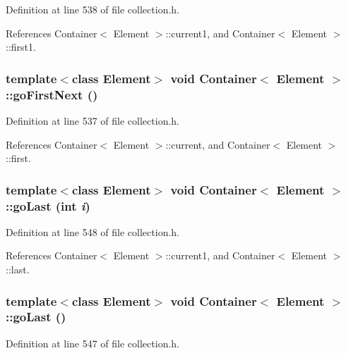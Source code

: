 Definition at line 538 of file collection.h.

References Container$<$ Element $>$::current1, and Container$<$ Element $>$::first1.\hypertarget{classContainer_63178fb6fc68357eceebbb98c6c3fd04}{
\subsubsection[{goFirstNext}]{\setlength{\rightskip}{0pt plus 5cm}template$<$class Element$>$ void {\bf Container}$<$ Element $>$::goFirstNext ()}}
\label{classContainer_63178fb6fc68357eceebbb98c6c3fd04}




Definition at line 537 of file collection.h.

References Container$<$ Element $>$::current, and Container$<$ Element $>$::first.\hypertarget{classContainer_21772656f0b4b9b273cc98bd9e59de9b}{
\subsubsection[{goLast}]{\setlength{\rightskip}{0pt plus 5cm}template$<$class Element$>$ void {\bf Container}$<$ Element $>$::goLast (int {\em i})}}
\label{classContainer_21772656f0b4b9b273cc98bd9e59de9b}




Definition at line 548 of file collection.h.

References Container$<$ Element $>$::current1, and Container$<$ Element $>$::last.\hypertarget{classContainer_bf6167a3f9e7187e7a014b8bfeba49ae}{
\subsubsection[{goLast}]{\setlength{\rightskip}{0pt plus 5cm}template$<$class Element$>$ void {\bf Container}$<$ Element $>$::goLast ()}}
\label{classContainer_bf6167a3f9e7187e7a014b8bfeba49ae}




Definition at line 547 of file collection.h.

